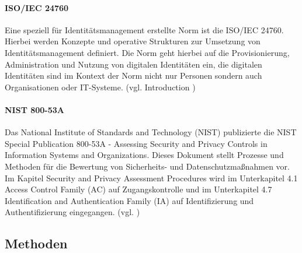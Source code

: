 \documentclass[11pt]{article}
\begin{document}
\paragraph{ISO/IEC 24760}
Eine speziell für Identitätsmanagement erstellte Norm ist die ISO/IEC 24760. Hierbei werden Konzepte und operative Strukturen zur Umsetzung von Identitätsmanagement definiert. Die Norm geht hierbei auf die Provisionierung, Administration und Nutzung von digitalen Identitäten ein, die digitalen Identitäten sind im Kontext der Norm nicht nur Personen sondern auch Organisationen oder IT-Systeme. (vgl. \cite{iso2019idm} \glqq{}Introduction \grqq{})
\paragraph{NIST 800-53A}
Das National Institute of Standards and Technology (NIST) publizierte die \glqq{}NIST Special Publication 800-53A - Assessing Security and Privacy Controls in Information Systems and Organizations\grqq{}. Dieses Dokument stellt Prozesse und Methoden für die Bewertung von Sicherheits- und Datenschutzmaßnahmen vor. Im Kapitel \glqq{}Security and Privacy Assessment Procedures\grqq{} wird im Unterkapitel 4.1 \glqq{}Access Control Family (AC)\grqq{} auf Zugangskontrolle und im Unterkapitel 4.7 \glqq{}Identification and Authentication Family (IA)\grqq{} auf Identifizierung und Authentifizierung eingegangen. (vgl. \cite{nist202280053a})
\subsection{Methoden}
\end{document}

